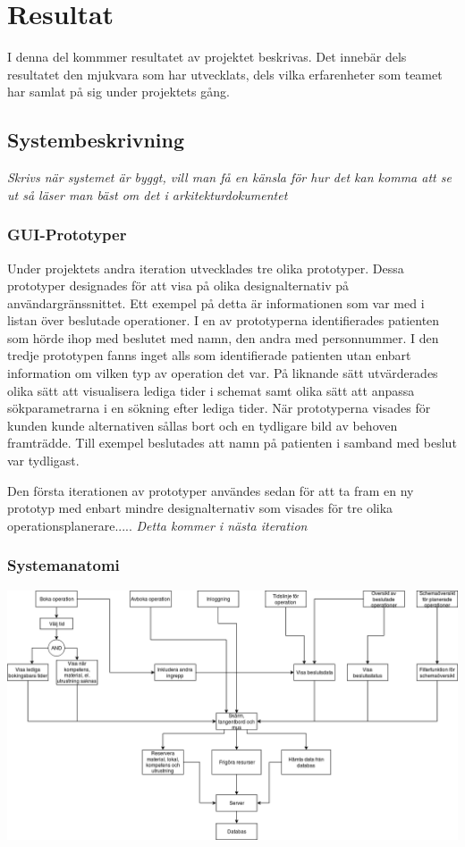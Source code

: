 \chapter{Resultat}
I denna del kommmer resultatet av projektet beskrivas. Det innebär dels
resultatet den mjukvara som har utvecklats, dels vilka erfarenheter som
teamet har samlat på sig under projektets gång.
\section{Systembeskrivning}
\textit{Skrivs när systemet är byggt, vill man få en känsla för hur det kan
komma att se ut så läser man bäst om det i arkitekturdokumentet}
\subsection{GUI-Prototyper}
Under projektets andra iteration utvecklades tre olika prototyper. Dessa
prototyper designades för att visa på olika designalternativ på
användargränssnittet. Ett exempel på detta är informationen som var med i listan
över beslutade operationer. I en av prototyperna identifierades patienten som hörde
ihop med beslutet med namn, den andra med personnummer. I den tredje prototypen
fanns inget alls som identifierade patienten utan enbart information om vilken
typ av operation det var. På liknande sätt utvärderades olika sätt att
visualisera lediga tider i schemat samt olika sätt att anpassa sökparametrarna i
en sökning efter lediga tider. När prototyperna visades för kunden kunde alternativen sållas bort och en tydligare bild av behoven framträdde.
Till exempel beslutades att namn på patienten i samband med beslut var tydligast.

Den första iterationen av prototyper användes sedan för att ta fram en ny
prototyp med enbart mindre designalternativ som visades för tre olika
operationsplanerare.....
\textit{Detta kommer i nästa iteration}
\subsection{Systemanatomi}
\includegraphics[width=\textwidth,height=.4\textheight]{Figures/Systemanatomi.png}\\

